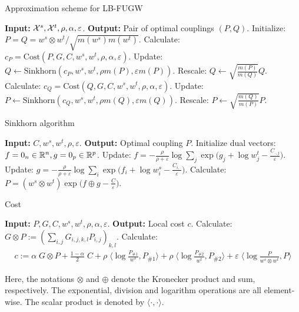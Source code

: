 \begin{algorithm}[th]
  \caption{Approximation scheme for LB-FUGW}
  \label{alg:lbfugw}
  \begin{algorithmic}[1]
      \STATE \textbf{Input:} $\mathcal X^s, \mathcal X^t, \rho, \alpha, \varepsilon$.
      \STATE \textbf{Output:} Pair of optimal couplings $(P, Q)$.
      \STATE Initialize: $P = Q = w^s \otimes w^t / \sqrt{m(w^s) m(w^t)}$.
          \STATE Calculate: $c_P = \text{Cost}(P,  G, C, w^s, w^t, \rho, \alpha, \varepsilon)$.
          \STATE Update: $Q \gets \text{Sinkhorn}(c_P, w^s, w^t, \rho m(P), \varepsilon m(P))$.
          \STATE Rescale: $Q \gets \sqrt{\frac{m(P)}{m(Q)}} Q$.
          \STATE Calculate: $c_Q = \text{Cost}(Q,  G, C, w^s, w^t, \rho, \alpha, \varepsilon)$.
          \STATE Update: $P \gets \text{Sinkhorn}(c_Q, w^s, w^t, \rho m(Q), \varepsilon m(Q))$.
          \STATE Rescale: $P \gets \sqrt{\frac{m(Q)}{m(P)}} P$.
      \ENDWHILE
  \end{algorithmic}
\end{algorithm}

\begin{algorithm}[th]
  \caption{Sinkhorn algorithm \citep{Sejourne19}}
  \label{alg:sinkhorn}
  \begin{algorithmic}[1]
      \STATE \textbf{Input:} $C, w^s, w^t, \rho, \varepsilon$.
      \STATE \textbf{Output:} Optimal coupling $P$.
      \STATE Initialize dual vectors: $f = 0_n \in \mathbb R^n, g = 0_p \in \mathbb R^p$.
          \STATE Update: $f = -\frac{\rho}{\rho + \varepsilon} \log \sum_j \exp \big( g_j + \log w^t_j - \frac{C_{\cdot,j}}{\varepsilon} \big)$.
        \STATE Update: $g = -\frac{\rho}{\rho + \varepsilon} \log \sum_i \exp \big( f_i + \log w^s_i - \frac{C_{i,\cdot}}{\varepsilon} \big)$.
      \ENDWHILE
      \STATE Calculate: $P = (w^s \otimes w^t) \exp \big(f \oplus g - \frac{C}{\varepsilon} \big)$.
  \end{algorithmic}
\end{algorithm}

\begin{algorithm}[th]
  \caption{Cost}
  \label{alg:local_cost}
  \begin{algorithmic}[1]
      \STATE \textbf{Input:} $P, G, C, w^s, w^t, \rho, \alpha, \varepsilon$.
      \STATE \textbf{Output:} Local cost $c$.
      \STATE Calculate: $G \otimes P := \left( \sum_{i,j} G_{i,j,k,l} P_{i,j} \right)_{k,l}$.
      \STATE Calculate:
      \begin{align*}
          c := \alpha \; G \otimes P + \frac{1 - \alpha}{2} \; C +
          \rho \; \langle \log \frac{P_{\#1}}{w^s}, P_{\#1} \rangle +
          \rho \; \langle \log \frac{P_{\#2}}{w^t}, P_{\#2} \rangle +
          \varepsilon \; \langle \log \frac{P}{w^s \otimes w^t}, P \rangle
      \end{align*}
  \end{algorithmic}
\end{algorithm}
Here, the notations $\otimes$ and $\oplus$ denote the Kronecker product and sum, respectively. The exponential, division and logarithm operations are all element-wise. The scalar product is denoted by $\langle \cdot, \cdot \rangle$.

